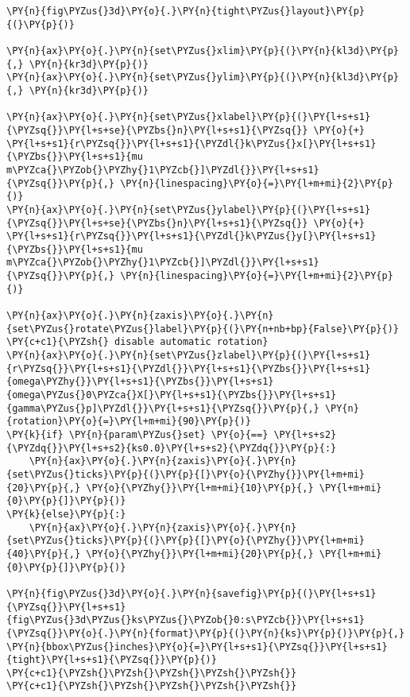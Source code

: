 \begin{Verbatim}[commandchars=\\\{\}]
\PY{n}{fig\PYZus{}3d}\PY{o}{.}\PY{n}{tight\PYZus{}layout}\PY{p}{(}\PY{p}{)}

\PY{n}{ax}\PY{o}{.}\PY{n}{set\PYZus{}xlim}\PY{p}{(}\PY{n}{kl3d}\PY{p}{,} \PY{n}{kr3d}\PY{p}{)}
\PY{n}{ax}\PY{o}{.}\PY{n}{set\PYZus{}ylim}\PY{p}{(}\PY{n}{kl3d}\PY{p}{,} \PY{n}{kr3d}\PY{p}{)}

\PY{n}{ax}\PY{o}{.}\PY{n}{set\PYZus{}xlabel}\PY{p}{(}\PY{l+s+s1}{\PYZsq{}}\PY{l+s+se}{\PYZbs{}n}\PY{l+s+s1}{\PYZsq{}} \PY{o}{+} \PY{l+s+s1}{r\PYZsq{}}\PY{l+s+s1}{\PYZdl{}k\PYZus{}x[}\PY{l+s+s1}{\PYZbs{}}\PY{l+s+s1}{mu m\PYZca{}\PYZob{}\PYZhy{}1\PYZcb{}]\PYZdl{}}\PY{l+s+s1}{\PYZsq{}}\PY{p}{,} \PY{n}{linespacing}\PY{o}{=}\PY{l+m+mi}{2}\PY{p}{)}
\PY{n}{ax}\PY{o}{.}\PY{n}{set\PYZus{}ylabel}\PY{p}{(}\PY{l+s+s1}{\PYZsq{}}\PY{l+s+se}{\PYZbs{}n}\PY{l+s+s1}{\PYZsq{}} \PY{o}{+} \PY{l+s+s1}{r\PYZsq{}}\PY{l+s+s1}{\PYZdl{}k\PYZus{}y[}\PY{l+s+s1}{\PYZbs{}}\PY{l+s+s1}{mu m\PYZca{}\PYZob{}\PYZhy{}1\PYZcb{}]\PYZdl{}}\PY{l+s+s1}{\PYZsq{}}\PY{p}{,} \PY{n}{linespacing}\PY{o}{=}\PY{l+m+mi}{2}\PY{p}{)}

\PY{n}{ax}\PY{o}{.}\PY{n}{zaxis}\PY{o}{.}\PY{n}{set\PYZus{}rotate\PYZus{}label}\PY{p}{(}\PY{n+nb+bp}{False}\PY{p}{)}  \PY{c+c1}{\PYZsh{} disable automatic rotation}
\PY{n}{ax}\PY{o}{.}\PY{n}{set\PYZus{}zlabel}\PY{p}{(}\PY{l+s+s1}{r\PYZsq{}}\PY{l+s+s1}{\PYZdl{}}\PY{l+s+s1}{\PYZbs{}}\PY{l+s+s1}{omega\PYZhy{}}\PY{l+s+s1}{\PYZbs{}}\PY{l+s+s1}{omega\PYZus{}0\PYZca{}X[}\PY{l+s+s1}{\PYZbs{}}\PY{l+s+s1}{gamma\PYZus{}p]\PYZdl{}}\PY{l+s+s1}{\PYZsq{}}\PY{p}{,} \PY{n}{rotation}\PY{o}{=}\PY{l+m+mi}{90}\PY{p}{)}
\PY{k}{if} \PY{n}{param\PYZus{}set} \PY{o}{==} \PY{l+s+s2}{\PYZdq{}}\PY{l+s+s2}{ks0.0}\PY{l+s+s2}{\PYZdq{}}\PY{p}{:}
    \PY{n}{ax}\PY{o}{.}\PY{n}{zaxis}\PY{o}{.}\PY{n}{set\PYZus{}ticks}\PY{p}{(}\PY{p}{[}\PY{o}{\PYZhy{}}\PY{l+m+mi}{20}\PY{p}{,} \PY{o}{\PYZhy{}}\PY{l+m+mi}{10}\PY{p}{,} \PY{l+m+mi}{0}\PY{p}{]}\PY{p}{)}
\PY{k}{else}\PY{p}{:}
    \PY{n}{ax}\PY{o}{.}\PY{n}{zaxis}\PY{o}{.}\PY{n}{set\PYZus{}ticks}\PY{p}{(}\PY{p}{[}\PY{o}{\PYZhy{}}\PY{l+m+mi}{40}\PY{p}{,} \PY{o}{\PYZhy{}}\PY{l+m+mi}{20}\PY{p}{,} \PY{l+m+mi}{0}\PY{p}{]}\PY{p}{)}

\PY{n}{fig\PYZus{}3d}\PY{o}{.}\PY{n}{savefig}\PY{p}{(}\PY{l+s+s1}{\PYZsq{}}\PY{l+s+s1}{fig\PYZus{}3d\PYZus{}ks\PYZus{}\PYZob{}0:s\PYZcb{}}\PY{l+s+s1}{\PYZsq{}}\PY{o}{.}\PY{n}{format}\PY{p}{(}\PY{n}{ks}\PY{p}{)}\PY{p}{,} \PY{n}{bbox\PYZus{}inches}\PY{o}{=}\PY{l+s+s1}{\PYZsq{}}\PY{l+s+s1}{tight}\PY{l+s+s1}{\PYZsq{}}\PY{p}{)}
\PY{c+c1}{\PYZsh{}\PYZsh{}\PYZsh{}\PYZsh{}\PYZsh{}}
\PY{c+c1}{\PYZsh{}\PYZsh{}\PYZsh{}\PYZsh{}\PYZsh{}}


\end{Verbatim}
